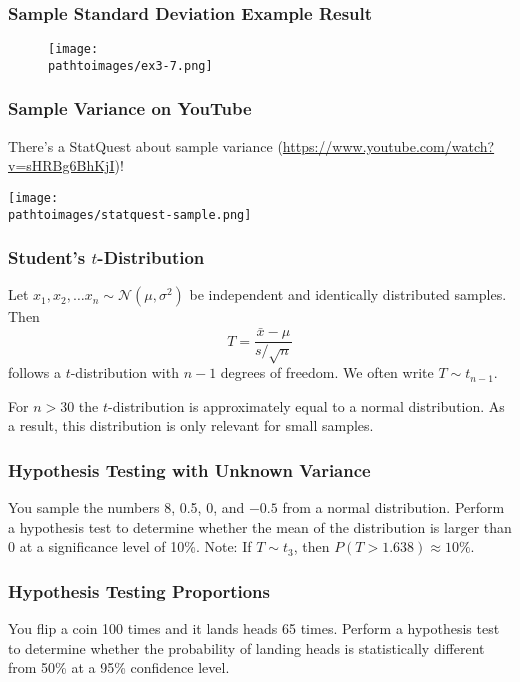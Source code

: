 \documentclass{beamer}
\newcommand{\pathtoimages}{/Users/charlesrambo/Desktop/Bootcamp24/Images}
\begin{document}
\begin{frame}
\frametitle{Sample Standard Deviation Example Result}
\begin{figure}
\centering
\texttt{[image: \\pathtoimages/ex3-7.png]}
\end{figure}
\end{frame}

\begin{frame}
\frametitle{Sample Variance on YouTube}
\small 
There's a StatQuest about sample variance ({\small \url{https://www.youtube.com/watch?v=sHRBg6BhKjI}})!
\begin{center}
\texttt{[image: \\pathtoimages/statquest-sample.png]}
\end{center}

\end{frame}

\begin{frame}
\frametitle{Student's $t$-Distribution}
\begin{Definition}
Let $x_1, x_2,\ldots x_n\sim{\mathcal{N}(\mu, \sigma^2)}$ be independent and identically distributed samples. Then
$$
T = \frac{\bar{x} - \mu}{s/\sqrt{n}}
$$
follows a $t$-distribution with $n-1$ degrees of freedom. We often write $T \sim{t_{n-1}}$.
\end{Definition}
For $n > 30$ the $t$-distribution is approximately equal to a normal distribution. As a result, this distribution is only relevant for small samples. 
\end{frame}

\begin{frame}[t]
\frametitle{Hypothesis Testing with Unknown Variance}
\tiny
\begin{Example}
You sample the numbers 8, 0.5, 0, and $-0.5$ from a normal distribution. Perform a hypothesis test to determine whether the mean of the distribution is larger than 0 at a significance level of 10\%. Note: If $T\sim{t_3}$, then $P(T > 1.638) \approx 10\%$.
\end{Example}

\end{frame}

\begin{frame}[t]
\frametitle{Hypothesis Testing Proportions}
\tiny
\begin{Example}
You flip a coin 100 times and it lands heads 65 times. Perform a hypothesis test to determine whether the probability of landing heads is statistically different from 50\% at a 95\% confidence level.
\end{Example}


\end{frame}
\end{document}
